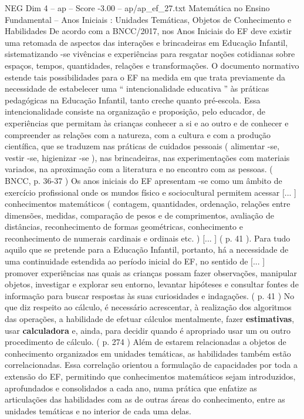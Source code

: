 \begin{textsample}{NEG Dim 4 – ap – Score -3.00 – ap/ap\_ef\_27.txt}
Matemática no Ensino Fundamental – Anos Iniciais : Unidades Temáticas, Objetos de Conhecimento e Habilidades De acordo com a BNCC/2017, nos Anos Iniciais do EF deve existir uma retomada de aspectos das interações e brincadeiras em Educação Infantil, sistematizando -se vivências e experiências para resgatar noções cotidianas sobre espaços, tempos, quantidades, relações e transformações.
O documento normativo estende tais possibilidades para o EF na medida em que trata previamente da necessidade de estabelecer uma “ intencionalidade educativa ” às práticas pedagógicas na Educação Infantil, tanto creche quanto pré-escola.
Essa intencionalidade consiste na organização e proposição, pelo educador, de experiências que permitam às crianças conhecer a si e ao outro e de conhecer e compreender as relações com a natureza, com a cultura e com a produção científica, que se traduzem nas práticas de cuidados pessoais ( alimentar -se, vestir -se, higienizar -se ), nas brincadeiras, nas experimentações com materiais variados, na aproximação com a literatura e no encontro com as pessoas. ( BNCC, p. 36-37 ) Os anos iniciais do EF apresentam -se como um âmbito de exercício profissional onde os mundos físico e sociocultural permitem acessar [... ] conhecimentos matemáticos ( contagem, quantidades, ordenação, relações entre dimensões, medidas, comparação de pesos e de comprimentos, avaliação de distâncias, reconhecimento de formas geométricas, conhecimento e reconhecimento de numerais cardinais e ordinais etc. ) [... ] ( p. 41 ).
Para tudo aquilo que se pretende para a Educação Infantil, portanto, há a necessidade de uma continuidade estendida ao período inicial do EF, no sentido de [... ] promover experiências nas quais as crianças possam fazer observações, manipular objetos, investigar e explorar seu entorno, levantar hipóteses e consultar fontes de informação para buscar respostas às suas curiosidades e indagações. ( p. 41 ) No que diz respeito ao cálculo, é necessário acrescentar, à realização dos algoritmos das operações, a habilidade de efetuar cálculos mentalmente, fazer \textbf{estimativas}, usar \textbf{calculadora} e, ainda, para decidir quando é apropriado usar um ou outro procedimento de cálculo. ( p. 274 ) Além de estarem relacionadas a objetos de conhecimento organizados em unidades temáticas, as habilidades também estão correlacionadas.
Essa correlação orientou a formulação de capacidades por toda a extensão do EF, permitindo que conhecimentos matemáticos sejam introduzidos, aprofundados e consolidados a cada ano, numa prática que enfatize as articulações das habilidades com as de outras áreas do conhecimento, entre as unidades temáticas e no interior de cada uma delas.

\end{textsample}
